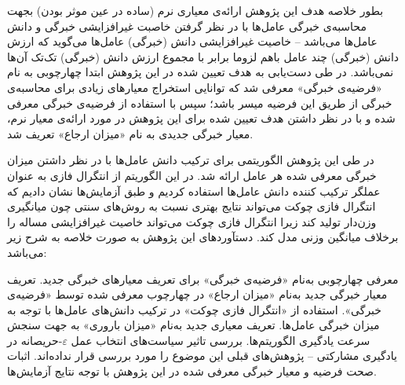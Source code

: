 بطور خلاصه هدف این پژوهش ارائه‌ی معیاری نرم (ساده در عین موثر بودن) بجهت محاسبه‌ی خبرگی عامل‌ها با در نظر گرفتن خاصبت غیرافزایشی  خبرگی و دانش عامل‌ها می‌باشد -- خاصیت غیرافزایشی دانش (خبرگی) عامل‌ها می‌گوید که ارزش دانش (خبرگی) چند عامل باهم لزوما برابر با مجموع ارزش دانش (خبرگی) تک‌تک آن‌ها نمی‌باشد. در طی دست‌یابی به هدف تعیین شده در این پژوهش ابتدا چهارچوبی به نام «فرضیه‌ی خبرگی» معرفی شد که توانایی استخراج معیارهای زیادی برای محاسبه‌ی خبرگی از طریق این فرضیه میسر باشد؛ سپس با استفاده از فرضیه‌ی خبرگی معرفی شده و با در نظر داشتن هدف تعیین شده برای این پژوهش در مورد ارائه‌ی معیار نرم، معیار خبرگی جدیدی به نام «میزان ارجاع» تعریف شد.

در طی این پژوهش الگوریتمی برای ترکیب دانش‌ عامل‌ها با در نظر داشتن میزان خبرگی معرفی شده هر عامل ارائه شد. در این الگوریتم از انتگرال فازی به عنوان عملگر ترکیب کننده دانش عامل‌ها استفاده کردیم و طبق آزمایش‌ها نشان دادیم که انتگرال فازی چوکت می‌تواند نتایج بهتری نسبت به روش‌های سنتی چون میانگیری وزن‌دار تولید کند زیرا انتگرال فازی چوکت می‌تواند خاصیت غیرافزایشی مساله را برخلاف میانگین وزنی مدل کند. دستآورد‌های این پژوهش به صورت خلاصه  به شرح زیر می‌باشد:
\begin{itemize}%
 معرفی چهارچوبی به‌نام «فرضیه‌ی خبرگی» برای تعریف معیارهای خبرگی جدید.
 تعریف معیار خبرگی جدید به‌نام «میزان ارجاع» در چهارچوب معرفی شده توسط «فرضیه‌ی خبرگی».
 استفاده از «انتگرال فازی چوکت» در ترکیب دانش‌های عامل‌ها با توجه به میزان خبرگی عامل‌ها.
 تعریف معیاری جدید به‌نام «میزان باروری» به جهت سنجش سرعت یادگیری الگوریتم‌ها.
 بررسی تاثیر سیاست‌های انتخاب عمل $\varepsilon$-حریصانه در یادگیری مشارکتی -- پژوهش‌های قبلی این موضوع را مورد بررسی قرار نداده‌اند.
 اثبات صحت فرضیه و معیار خبرگی معرفی شده در این پژوهش با توجه نتایج آزمایش‌ها.
\end{itemize}